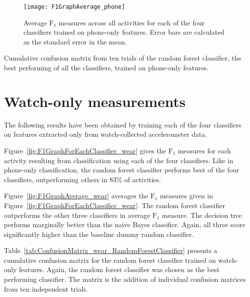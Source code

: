     \begin{figure}
      \centering
      \texttt{[image: F1GraphAverage\_phone]}
      \caption[Average $\mathrm{F}_1$ measures across all activities for each of the four classifiers trained on phone-only features.]{Average $\mathrm{F}_1$ measures across all activities for each of the four classifiers trained on phone-only features. Error bars are calculated as the standard error in the mean.}
      \label{fig:F1GraphAverage_phone} 
    \end{figure}

    \begin{table}
      \tabcolsep=0.11cm
      \centering
        
      \caption[Confusion matrix of the random forest classifier trained on phone-only features]{Cumulative confusion matrix from ten trials of the random forest classifier, the best performing of all the classifiers, trained on phone-only features.}
      \label{tab:ConfusionMatrix_phone_RandomForestClassifier}
    \end{table}
    
  \section{Watch-only measurements}
    The following results have been obtained by training each of the four classifiers on features extracted only from watch-collected accelerometer data.
    
    Figure~\ref{fig:F1GraphForEachClassifier_wear} gives the $\mathrm{F}_1$ measures for each activity resulting from classification using each of the four classifiers. Like in phone-only classification, the random forest classifier performs best of the four classifiers, outperforming others in 83\% of activities.
    
    Figure~\ref{fig:F1GraphAverage_wear} averages the $\mathrm{F}_1$ measures given in Figure~\ref{fig:F1GraphForEachClassifier_wear}. The random forest classifier outperforms the other three classifiers in average $\mathrm{F}_1$ measure. The decision tree performs marginally better than the naive Bayes classifier. Again, all three score significantly higher than the baseline dummy random classifier.
    
    Table~\ref{tab:ConfusionMatrix_wear_RandomForestClassifier} presents a cumulative confusion matrix for the random forest classifier trained on watch-only features. Again, the random forest classifier was chosen as the best performing classifier. The matrix is the addition of individual confusion matrices from ten independent trials.
    
